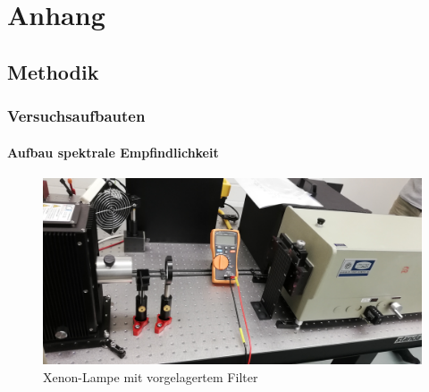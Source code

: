

\chapter{Anhang}
\label{chap:anhangA}
\section{Methodik}
\subsection{Versuchsaufbauten}
\subsubsection{Aufbau spektrale Empfindlichkeit}

\begin{figure}[h]
    \centering
    \includegraphics[width = \linewidth]{Bilder/Aufbau6.jpg}
    \caption{Xenon-Lampe mit vorgelagertem Filter}
\end{figure}

